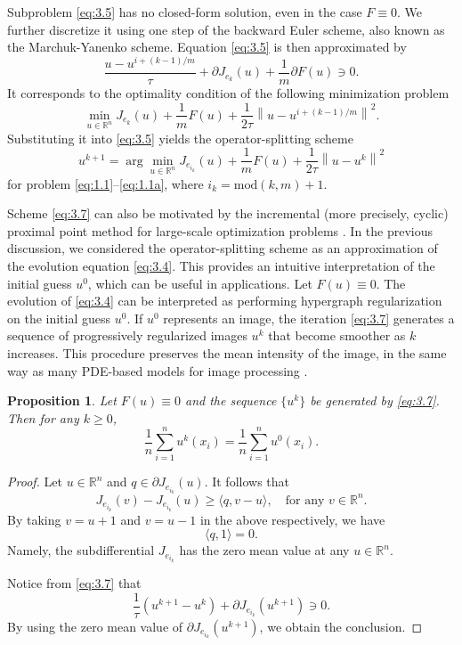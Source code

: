 \documentclass{article}
\newtheorem{proposition}[theorem]{Proposition}
\theoremstyle{definition}
\begin{document}
Subproblem \eqref{eq:3.5} has no closed-form solution, even in the case $F\equiv 0$.
 We further discretize it using one step of the backward Euler scheme, also known as the Marchuk-Yanenko scheme. Equation \eqref{eq:3.5} is then approximated by
 \begin{equation*}
   \frac{u-u^{i+(k-1)/m}}{\tau}+\partial J_{e_k}(u)
   +\frac{1}{m}\partial F(u)\ni 0.
 \end{equation*}
It corresponds to the optimality condition of the following minimization problem
\begin{equation*}%
  \min_{u\in\mathbb{R}^n} J_{e_k}(u) + \frac{1}{m} F(u) + \frac{1}{2\tau}\left\|u- u^{i+(k-1)/m}\right\|^2.
\end{equation*}
Substituting it into \eqref{eq:3.5} yields the operator-splitting scheme
\begin{equation}\label{eq:3.7}
  u^{k+1}=\arg\min_{u\in\mathbb{R}^n}J_{e_{i_k}}(u)  +\frac{1}{m} F(u)+ \frac{1}{2\tau}\left\|u- u^{k}\right\|^2
\end{equation}
for problem \eqref{eq:1.1}--\eqref{eq:1.1a}, where $i_k=\mbox{mod}(k,m)+1$.


Scheme \eqref{eq:3.7} can also be motivated by the incremental (more precisely, cyclic) proximal point method for large-scale optimization problems \cite{bertsekas2011incremental}.
In the previous discussion, we considered the operator-splitting scheme as an approximation of the evolution equation \eqref{eq:3.4}.
This provides an intuitive interpretation of the initial guess $u^0$, which can be useful in applications.
Let $F(u) \equiv 0$.
The evolution of \eqref{eq:3.4} can be interpreted as performing hypergraph regularization on the initial guess $u^0$.
If $u^0$ represents an image, the iteration \eqref{eq:3.7} generates a sequence of progressively regularized images ${u^k}$ that become smoother as $k$ increases.
This procedure preserves the mean intensity of the image, in the same way as many PDE-based models for image processing \cite{aubert2006mathematical}.


\begin{proposition}
  Let $F(u)\equiv 0$ and the sequence $\{u^k\}$ be generated by \eqref{eq:3.7}. Then for any $k\geq 0$,
  \[
  \frac{1}{n}\sum_{i=1}^{n}u^k(x_i)=\frac{1}{n}\sum_{i=1}^{n}u^0(x_i).
  \]
\end{proposition}
\begin{proof}
  Let $u\in\mathbb{R}^n$ and  $q\in \partial J_{e_{i_k}}(u)$. It follows that
  \[
  J_{e_{i_k}}(v)-J_{e_{i_k}}(u)\geq \langle q, v-u\rangle, \quad \mbox{for any } v\in\mathbb{R}^n.
  \]
  By taking $v=u+1$ and $v=u-1$ in the above respectively, we have
  \[
  \langle q, 1\rangle =0.
  \]
  Namely, the subdifferential $J_{e_{i_k}}$ has the zero mean value at any $u\in\mathbb{R}^n$.


  Notice from \eqref{eq:3.7} that
  \[
  \frac{1}{\tau} (u^{k+1}-u^k) +\partial J_{e_{i_k}}(u^{k+1})\ni 0.
  \]
  By using the zero mean value of $\partial J_{e_{i_k}}(u^{k+1})$, we obtain the conclusion.
\end{proof}
\end{document}
